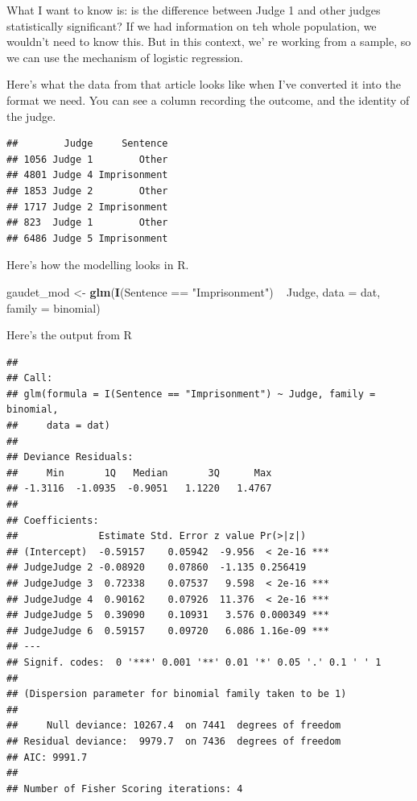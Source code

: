 \documentclass[12pt,twoside]{article}
\newenvironment{Shaded}{}{}
\newcommand{\KeywordTok}[1]{\textcolor[rgb]{0.00,0.44,0.13}{\textbf{{#1}}}}
\newcommand{\DataTypeTok}[1]{\textcolor[rgb]{0.56,0.13,0.00}{{#1}}}
\newcommand{\StringTok}[1]{\textcolor[rgb]{0.25,0.44,0.63}{{#1}}}
\newcommand{\NormalTok}[1]{{#1}}
\begin{document}
What I want to know is: is the difference between Judge 1 and other
judges statistically significant? If we had information on teh whole
population, we wouldn't need to know this. But in this context, we' re
working from a sample, so we can use the mechanism of logistic
regression.

Here's what the data from that article looks like when I've converted it
into the format we need. You can see a column recording the outcome, and
the identity of the judge.

\begin{verbatim}
##        Judge     Sentence
## 1056 Judge 1        Other
## 4801 Judge 4 Imprisonment
## 1853 Judge 2        Other
## 1717 Judge 2 Imprisonment
## 823  Judge 1        Other
## 6486 Judge 5 Imprisonment
\end{verbatim}

Here's how the modelling looks in R.

\begin{Shaded}
\begin{Highlighting}[]
\NormalTok{gaudet_mod <-}\StringTok{ }\KeywordTok{glm}\NormalTok{(}\KeywordTok{I}\NormalTok{(Sentence ==}\StringTok{ "Imprisonment"}\NormalTok{) ~}\StringTok{ }\NormalTok{Judge, }\DataTypeTok{data =} \NormalTok{dat, }\DataTypeTok{family =} \NormalTok{binomial)}
\end{Highlighting}
\end{Shaded}

Here's the output from R

\begin{verbatim}
## 
## Call:
## glm(formula = I(Sentence == "Imprisonment") ~ Judge, family = binomial, 
##     data = dat)
## 
## Deviance Residuals: 
##     Min       1Q   Median       3Q      Max  
## -1.3116  -1.0935  -0.9051   1.1220   1.4767  
## 
## Coefficients:
##              Estimate Std. Error z value Pr(>|z|)    
## (Intercept)  -0.59157    0.05942  -9.956  < 2e-16 ***
## JudgeJudge 2 -0.08920    0.07860  -1.135 0.256419    
## JudgeJudge 3  0.72338    0.07537   9.598  < 2e-16 ***
## JudgeJudge 4  0.90162    0.07926  11.376  < 2e-16 ***
## JudgeJudge 5  0.39090    0.10931   3.576 0.000349 ***
## JudgeJudge 6  0.59157    0.09720   6.086 1.16e-09 ***
## ---
## Signif. codes:  0 '***' 0.001 '**' 0.01 '*' 0.05 '.' 0.1 ' ' 1
## 
## (Dispersion parameter for binomial family taken to be 1)
## 
##     Null deviance: 10267.4  on 7441  degrees of freedom
## Residual deviance:  9979.7  on 7436  degrees of freedom
## AIC: 9991.7
## 
## Number of Fisher Scoring iterations: 4
\end{verbatim}
\end{document}
